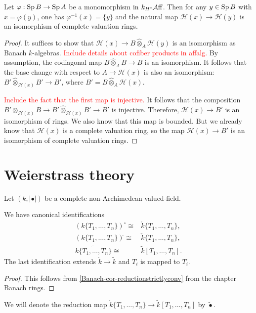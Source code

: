 \begin{proposition}\label{prop-monoaffinj}
    Let $\varphi:\operatorname{Sp} B\rightarrow \operatorname{Sp} A$ be a monomorphism in $k_H\text{-}\mathcal{A}\mathrm{ff}$. Then for any $y\in \operatorname{Sp} B$ with $x=\varphi(y)$, one has $\varphi^{-1}(x)=\{y\}$ and the natural map $\mathscr{H}(x)\rightarrow \mathscr{H}(y)$ is an isomorphism of complete valuation rings.
\end{proposition}
\begin{proof}
    It suffices to show that $\mathscr{H}(x)\rightarrow B\hat{\otimes}_A \mathscr{H}(y)$ is an isomorphism as Banach $k$-algebras. \textcolor{red}{Include details about cofiber products in affalg.} By assumption, the codiagonal map $B\hat{\otimes}_A B\rightarrow B$ is an isomorphism. It follows that the base change with respect to $A\rightarrow \mathscr{H}(x)$ is also an isomorphism: $B'\hat{\otimes}_{\mathscr{H}(x)}B'\rightarrow B'$, where $B'=B\hat{\otimes}_A \mathscr{H}(x)$.

    \textcolor{red}{Include the fact that the first map is injective.}
    It follows that the composition $B'\otimes_{\mathscr{H}(x)}B\rightarrow B'\hat{\otimes}_{\mathscr{H}(x)}B'\rightarrow B'$ is injective.
    Therefore, $\mathscr{H}(x)\rightarrow B'$ is an isomorphism of rings.  We also know that this map is bounded.
    But we already know that $\mathscr{H}(x)$ is a complete valuation ring, so the map $\mathscr{H}(x)\rightarrow B'$ is an isomorphism of complete valuation rings.
\end{proof}

\section{Weierstrass theory}
Let $(k,|\bullet|)$ be a complete non-Archimedean valued-field.

\begin{proposition}\label{prop-reductionTn}
    We have canonical identifications
    \[
        \begin{aligned}
        (k\{T_1,\ldots,T_n\} )^{\circ}\cong & \mathring{k}\{T_1,\ldots,T_n\},\\
        (k\{T_1,\ldots,T_n\} )^{\check{}}\cong & \check{k}\{T_1,\ldots,T_n\},\\
        \widetilde{k\{T_1,\ldots,T_n\}  }\cong & \tilde{k}[T_1,\ldots,T_n].
        \end{aligned}
    \]
    The last identification extends $\mathring{k}\rightarrow \tilde{k}$ and $T_i$ is mapped to $T_i$.
\end{proposition}
\begin{proof}
    This follows from \cref{Banach-cor-reductionstrictlyconv} from the chapter Banach rings.
\end{proof}
We will denote the reduction map $\mathring{k}\{T_1,\ldots,T_n\}\rightarrow \tilde{k}[T_1,\ldots,T_n]$ by $\tilde{\bullet}$.

